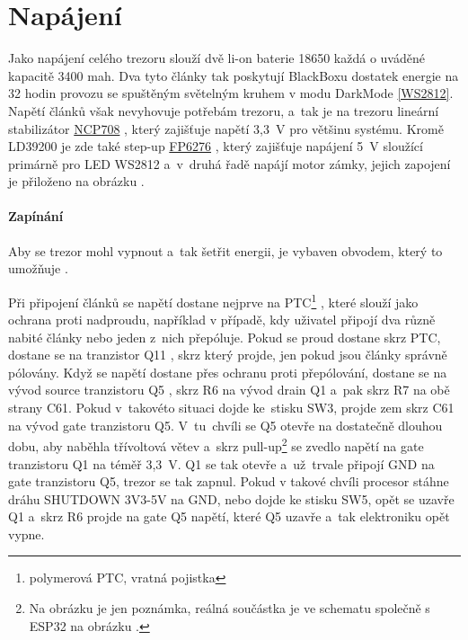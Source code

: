 \section{Napájení}
Jako napájení celého trezoru slouží dvě li-on baterie 18650 každá o uváděné kapacitě 3400 mah. 
Dva tyto články tak poskytují BlackBoxu dostatek energie na 32 hodin provozu se spuštěným světelným kruhem v modu DarkMode \ref{WS2812}.
Napětí článků však nevyhovuje potřebám trezoru, a~tak je na trezoru lineární 
stabilizátor \href{https://datasheet.lcsc.com/szlcsc/1808280153_STMicroelectronics-LD39200PU33R_C222192.pdf}{NCP708} \parencite{LD39200}, 
který zajišťuje napětí 3,3~V pro většinu systému. Kromě LD39200 je zde také step-up \href{https://datasheet.lcsc.com/szlcsc/Feeling-Tech-FP6276AXR-G1_C83308.pdf}{FP6276} \parencite{fp6276a}, 
který zajišťuje napájení 5~V sloužící primárně pro LED WS2812 a~v~druhá řadě napájí motor zámky,
jejich zapojení je přiloženo na obrázku .

\paragraph*{Zapínání}
Aby se trezor mohl vypnout a~tak šetřit energii, je vybaven obvodem, který to umožňuje .

Při připojení článků se napětí dostane nejprve na PTC\footnote{polymerová PTC, vratná pojistka } \parencite{polyfuse},
které slouží jako ochrana proti nadproudu, například v případě, kdy uživatel připojí dva různě nabité články nebo jeden z~nich přepóluje.
Pokud se proud dostane skrz PTC, dostane se na tranzistor Q11 \parencite{power_MOSFET}, skrz který projde, jen pokud jsou články správně pólovány.
Když se napětí dostane přes ochranu proti přepólování, dostane se na 
vývod source
tranzistoru Q5 \parencite{power_MOSFET}, skrz R6 na vývod drain
Q1 a~pak skrz R7 na obě strany C61.
Pokud v~takovéto situaci dojde ke~stisku SW3, projde zem skrz C61 na vývod gate tranzistoru Q5. 
V~tu~chvíli se Q5 otevře na dostatečně dlouhou dobu, 
aby naběhla třívoltová větev a~skrz pull-up\footnote{Na obrázku je jen poznámka, reálná součástka je ve schematu společně s ESP32 na obrázku .}
se zvedlo napětí na gate tranzistoru Q1 na téměř 3,3~V. Q1 se tak otevře a~už~trvale připojí GND na gate tranzistoru Q5, trezor se tak zapnul. Pokud v takové chvíli procesor stáhne dráhu SHUTDOWN 3V3-5V 
na GND, nebo dojde ke stisku SW5, opět se uzavře Q1 a~skrz R6 projde na gate Q5 napětí, které Q5 uzavře a~tak elektroniku opět vypne.

